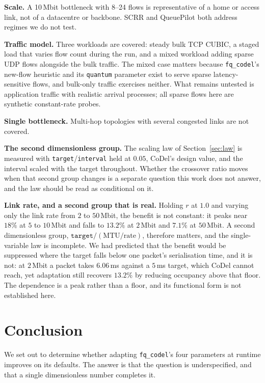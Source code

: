\documentclass[conference]{IEEEtran}
\begin{document}
\textbf{Scale.} A 10\,Mbit bottleneck with 8--24 flows is representative of a
home or access link, not of a datacentre or backbone. SCRR \cite{scrr2025} and
QueuePilot \cite{queuepilot2023} both address regimes we do not test.

\textbf{Traffic model.} Three workloads are covered: steady bulk TCP CUBIC,
a staged load that varies flow count during the run, and a mixed workload
adding sparse UDP flows alongside the bulk traffic. The mixed case matters
because \texttt{fq\_codel}'s new-flow heuristic and its \texttt{quantum}
parameter exist to serve sparse latency-sensitive flows, and bulk-only traffic
exercises neither. What remains untested is application traffic with realistic
arrival processes; all sparse flows here are synthetic constant-rate probes.

\textbf{Single bottleneck.} Multi-hop topologies with several congested links
are not covered.

\textbf{The second dimensionless group.} The scaling law of
Section~\ref{sec:law} is measured with \texttt{target}/\texttt{interval} held
at $0.05$, CoDel's design value, and the interval scaled with the target
throughout. Whether the crossover ratio moves when that second group changes
is a separate question this work does not answer, and the law should be read as
conditional on it.

\textbf{Link rate, and a second group that is real.} Holding $r$ at $1.0$ and
varying only the link rate from $2$ to $50$\,Mbit, the benefit is not constant:
it peaks near $18\%$ at $5$ to $10$\,Mbit and falls to $13.2\%$ at $2$\,Mbit
and $7.1\%$ at $50$\,Mbit. A second dimensionless group,
$\texttt{target}/(\mathrm{MTU}/\mathrm{rate})$, therefore matters, and the
single-variable law is incomplete. We had predicted that the benefit would be
suppressed where the target falls below one packet's serialisation time, and
it is not: at $2$\,Mbit a packet takes $6.06$\,ms against a $5$\,ms target,
which CoDel cannot reach, yet adaptation still recovers $13.2\%$ by reducing
occupancy above that floor. The dependence is a peak rather than a floor, and
its functional form is not established here.

\section{Conclusion}

We set out to determine whether adapting \texttt{fq\_codel}'s four parameters at
runtime improves on its defaults. The answer is that the question is
underspecified, and that a single dimensionless number completes it.
\end{document}
